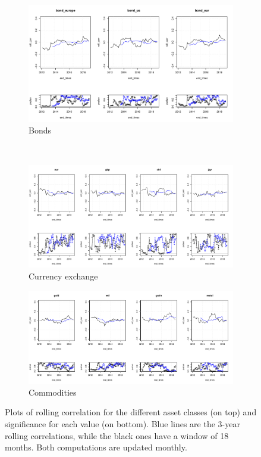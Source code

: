 \begin{figure}
	\begin{subfigure}{0.66\textwidth}
		\centering
		\includegraphics[width=0.8\linewidth]{Images/rolling_bonds}
		\caption{Bonds}
		\label{roll_bonds}
	\end{subfigure}\\
	\begin{subfigure}{\textwidth}
		\centering
		\includegraphics[width=0.8\linewidth]{Images/rolling_fx}
		\caption{Currency exchange}
		\label{roll_currencies}
	\end{subfigure}
	\begin{subfigure}{\textwidth}
		\centering
		\includegraphics[width=0.8\linewidth]{Images/rolling_commodities}
		\caption{Commodities}
		\label{roll_commodities}
	\end{subfigure}
	\caption{Plots of rolling correlation for the different asset classes (on top) and significance for each value (on bottom). Blue lines are the 3-year rolling correlations, while the black ones have a window of 18 months. Both computations are updated monthly.}
	\label{roll_corr}
\end{figure}


